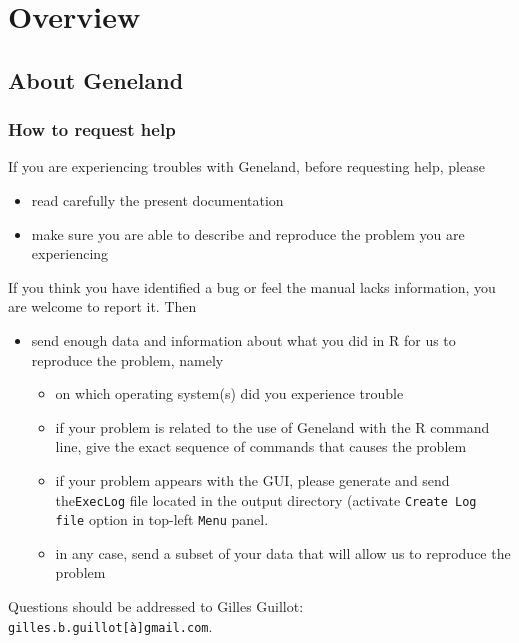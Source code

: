 \documentclass{article}
\begin{document}
\section{Overview}
\subsection{About {\sc Geneland}}

\subsubsection{How to request help}
If you are experiencing troubles with {\sc Geneland}, before requesting help, please 
\begin{itemize}
\item read carefully the present documentation 
\item make sure you are able to describe and reproduce the problem you are experiencing
\end{itemize}

If you think you have identified a bug or feel the manual lacks information, you are welcome to report it. 
Then
\begin{itemize}

\item  send enough data and information about what you did in R  for us to reproduce the problem, namely
  \begin{itemize}
  \item on which operating system(s) did you experience trouble 
  \item if your problem is related to the use of {\sc Geneland} with the R command line, 
    give the exact sequence of commands that causes the problem
  \item  if your problem appears with the GUI, please generate and send the\texttt{ExecLog} file  
    located in the output directory (activate \texttt{Create Log file} option in top-left \texttt{Menu} panel.
  \item in any case, send a subset of your data that will allow us to reproduce the problem 
  \end{itemize}
\end{itemize}

Questions should be addressed to Gilles Guillot: \texttt{gilles.b.guillot[\`a]gmail.com}.
\end{document}
